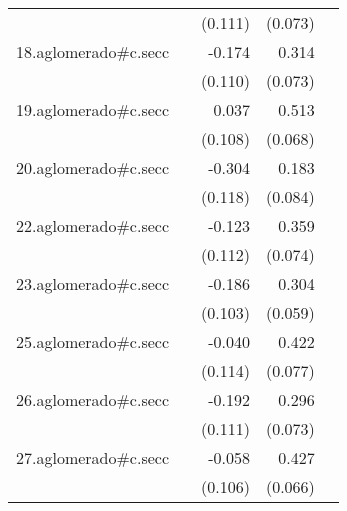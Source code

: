 {\begin{longtable}{l*{4}{D{.}{.}{-1}}}
            &                     &     (0.111)         &     (0.073)         &                     \\
\addlinespace
18.aglomerado#c.secc&                     &      -0.174         &       0.314\sym{***}&                     \\
            &                     &     (0.110)         &     (0.073)         &                     \\
\addlinespace
19.aglomerado#c.secc&                     &       0.037         &       0.513\sym{***}&                     \\
            &                     &     (0.108)         &     (0.068)         &                     \\
\addlinespace
20.aglomerado#c.secc&                     &      -0.304\sym{*}  &       0.183\sym{*}  &                     \\
            &                     &     (0.118)         &     (0.084)         &                     \\
\addlinespace
22.aglomerado#c.secc&                     &      -0.123         &       0.359\sym{***}&                     \\
            &                     &     (0.112)         &     (0.074)         &                     \\
\addlinespace
23.aglomerado#c.secc&                     &      -0.186         &       0.304\sym{***}&                     \\
            &                     &     (0.103)         &     (0.059)         &                     \\
\addlinespace
25.aglomerado#c.secc&                     &      -0.040         &       0.422\sym{***}&                     \\
            &                     &     (0.114)         &     (0.077)         &                     \\
\addlinespace
26.aglomerado#c.secc&                     &      -0.192         &       0.296\sym{***}&                     \\
            &                     &     (0.111)         &     (0.073)         &                     \\
\addlinespace
27.aglomerado#c.secc&                     &      -0.058         &       0.427\sym{***}&                     \\
            &                     &     (0.106)         &     (0.066)         &                     \\

\end{longtable}}
